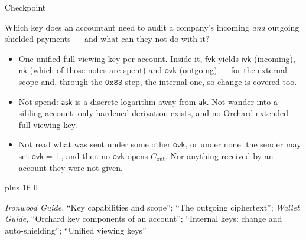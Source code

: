 \documentclass[aspectratio=169,11pt]{beamer}
\newcommand{\aksym}{\ensuremath{\mathsf{ak}}}
\newcommand{\nksym}{\ensuremath{\mathsf{nk}}}
\newcommand{\asksym}{\ensuremath{\mathsf{ask}}}
\newcommand{\ivk}{\ensuremath{\mathsf{ivk}}}
\newcommand{\fvk}{\ensuremath{\mathsf{fvk}}}
\newcommand{\ovk}{\ensuremath{\mathsf{ovk}}}
\newcommand{\src}[1]{\par\vskip0pt plus 1filll
  {\fontsize{6}{7.2}\selectfont\color{arbdim}\raggedright #1\par}}
\begin{document}
\begin{frame}{Checkpoint}
\begin{center}
\Large Which key does an accountant need to audit a company's incoming
\emph{and} outgoing shielded payments --- and what can they not do with
it?
\end{center}
\pause
\medskip
\begin{itemize}
  \item One unified full viewing key per account. Inside it, \fvk{} yields
    \ivk{} (incoming), \nksym{} (which of those notes are spent) and
    \ovk{} (outgoing) --- for the external scope and, through the
    $\mathtt{0x83}$ step, the internal one, so change is covered too.
  \item Not spend: \asksym{} is a discrete logarithm away from \aksym.
    Not wander into a sibling account: only hardened derivation exists,
    and no Orchard extended full viewing key.
  \item Not read what was sent under some other \ovk, or under none: the
    sender may set $\ovk = \bot$, and then no \ovk{} opens
    $C_{\mathrm{out}}$. Nor anything received by an account they were not
    given.
\end{itemize}
\src{\emph{Ironwood Guide}, ``Key capabilities and scope''; ``The outgoing
ciphertext''; \emph{Wallet Guide}, ``Orchard key components of an account'';
``Internal keys: change and auto-shielding''; ``Unified viewing keys''}
\end{frame}
\end{document}
